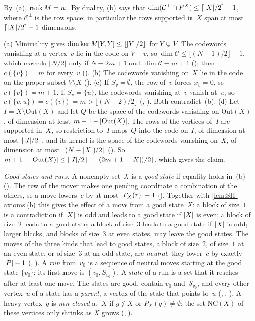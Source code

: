 By~(a), $\operatorname{rank} M=m$. By duality, (b) says that $\dim(\mathcal C^\perp\cap F^X)\le\lceil\lvert X \rvert/2\rceil-1$, where
$\mathcal C^\perp$ is the row space; in particular the rows supported in~$X$ span at most $\lceil\lvert X \rvert/2\rceil-1$
dimensions.

\begin{outline}
(a) Minimality gives $\dim\ker M[Y,Y]\le\lfloor\lvert Y \rvert/2\rfloor$ for $Y\subsetneq V$. The codewords vanishing at a vertex~$v$
lie in the code on $V-v$, so $\dim\mathcal C\le\lfloor(N-1)/2\rfloor+1$, which exceeds $\lfloor N/2\rfloor$ only if $N=2m+1$ and
$\dim\mathcal C=m+1$ (); then $c(\{v\})=m$ for every~$v$ (). (b) The
codewords vanishing on~$X$ lie in the code on the proper subset $V\setminus X$
(). (c) If $S_v=\emptyset$, the row of~$v$ forces $x_v=0$, so $c(\{v\})=m+1$. If
$S_v=\{u\}$, the codewords vanishing at~$v$ vanish at~$u$, so $c(\{v,u\})=c(\{v\})=m>\lfloor(N-2)/2\rfloor$
(, ). Both contradict~(b). (d) Let $I=X\setminus\mathrm{Out}(X)$ and let $Q$ be
the space of the codewords vanishing on $\mathrm{Out}(X)$, of dimension at least $m+1-\lvert \mathrm{Out}(X) \rvert$. The rows of the
vertices of~$I$ are supported in~$X$, so restriction to~$I$ maps~$Q$ into the code on~$I$, of dimension at most
$\lfloor\lvert I \rvert/2\rfloor$, and its kernel is the space of the codewords vanishing on~$X$, of dimension at most
$\lfloor(N-\lvert X \rvert)/2\rfloor$ (). So
$m+1-\lvert \mathrm{Out}(X) \rvert\le\lfloor\lvert I \rvert/2\rfloor+\lfloor(2m+1-\lvert X \rvert)/2\rfloor$, which gives the claim.
\end{outline}

\emph{Good states and runs.} A nonempty set~$X$ is a \emph{good state} if equality holds in~(b) (). The row of
the mover makes one pending coordinate a combination of the others, so a move lowers~$c$ by at most $\lvert P_X(r) \rvert-1$
(). Together with \cref{lem:SH-axioms}(b) this gives the effect of a move from a good state~$X$: a block of
size~$1$ is a contradiction if $\lvert X \rvert$ is odd and leads to a good state if $\lvert X \rvert$ is even; a block of size~$2$ leads to a
good state; a block of size~$3$ leads to a good state if $\lvert X \rvert$ is odd; larger blocks, and blocks of size~$3$ at even
states, may leave the good states. The moves of the three kinds that lead to good states, a block of size~$2$, of size~$1$ at
an even state, or of size~$3$ at an odd state, are \emph{neutral}; they lower~$c$ by exactly $\lvert P \rvert-1$
(, ). A \emph{run} from~$v_0$ is a sequence of neutral moves starting at
the good state $\{v_0\}$; its first move is $(v_0,S_{v_0})$. A \emph{state} of a run is a set that it reaches after at least
one move. The states are good, contain $v_0$ and~$S_{v_0}$, and every other vertex~$u$ of a state has a \emph{parent}, a
vertex of the state that points to~$u$ (, , ). A heavy vertex~$g$ is \emph{non-closed} at~$X$ if $g\notin X$ or
$P_X(g)\ne\emptyset$; the set $\mathrm{NC}(X)$ of these vertices only shrinks as $X$ grows (, ).

